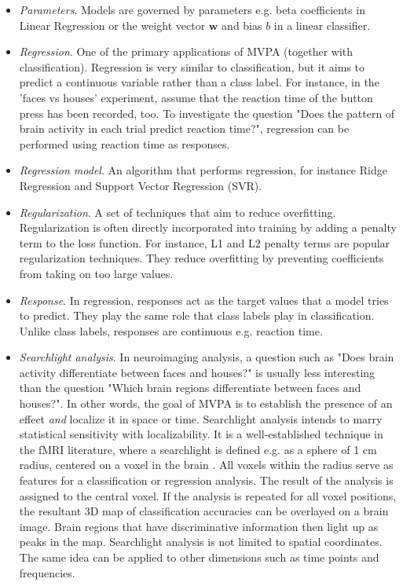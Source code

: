\documentclass[utf8]{frontiersSCNS} %
\newcommand{\w}{\mathbf{w}}
\begin{document}
\begin{itemize}
\item \textit{Parameters}. Models are governed by parameters e.g. beta coefficients in Linear Regression or the weight vector $\w$ and bias $b$ in a linear classifier.
\item \textit{Regression}. One of the primary applications of MVPA (together with classification). Regression is very similar to classification, but it aims to predict a continuous variable rather than a  class label. For instance, in the 'faces vs houses' experiment, assume that the reaction time of the button press has been recorded, too. To investigate the question "Does the pattern of brain activity in each trial predict reaction time?", regression can be performed using reaction time as responses.
\item \textit{Regression model}. An algorithm that performs regression, for instance Ridge Regression and Support Vector Regression (SVR).
\item \textit{Regularization}. A set of techniques that aim to reduce overfitting. Regularization is often directly incorporated into training by adding a penalty term to the loss function. For instance, L1 and L2 penalty terms are popular regularization techniques. They reduce overfitting by preventing coefficients from taking on too large values.
\item \textit{Response}. In regression, responses act as the target values that a model tries to predict. They play the same role that class labels play in classification. Unlike class labels, responses are continuous e.g. reaction time.
\item\textit{Searchlight analysis}. In neuroimaging analysis, a question such as "Does brain activity differentiate between faces and houses?" is usually less interesting than the question "Which brain regions differentiate between faces and houses?". In other words, the goal of MVPA is to establish the presence of an effect \textit{and} localize it in space or time. Searchlight analysis intends to marry statistical sensitivity with localizability. It is a well-established technique in the fMRI literature, where a searchlight is defined e.g. as a sphere of 1 cm radius, centered on a voxel in the brain \citep{Kriegeskorte2006Information-basedMapping}. All voxels within the radius serve as features for a classification or regression analysis. The result of the analysis is assigned to the central voxel. If the analysis is repeated for all voxel positions, the resultant 3D map of classification accuracies can be overlayed on a brain image. Brain regions that have discriminative information then light up as peaks in the map. Searchlight analysis is not limited to spatial coordinates. The same idea can be applied to other dimensions such as time points and frequencies.

\end{itemize}
\end{document}
